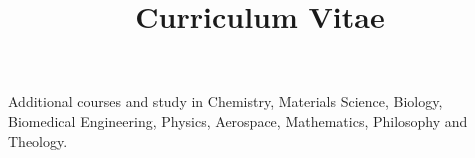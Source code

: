 \documentclass[skipsamekey,11pt,english]{curve}
\title{Curriculum Vitae}
\begin{document}
\makeheaders[c]
Additional courses and study in Chemistry, Materials Science, Biology, Biomedical Engineering, Physics, Aerospace, Mathematics, Philosophy and Theology.
\medskip

\pagebreak




\end{document}
